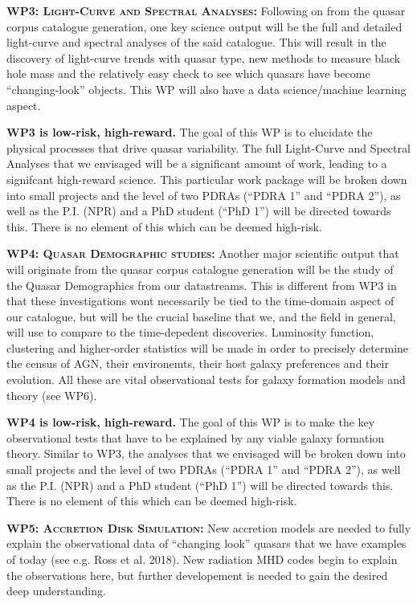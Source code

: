 \documentclass[oneside, a4paper, onecolumn, 11pt]{article}
\begin{document}
\smallskip
\smallskip
\noindent
\textbf{\textsc{WP3: Light-Curve and Spectral Analyses:}} 
Following on from the quasar corpus catalogue generation, one key
science output will be the full and detailed light-curve and spectral
analyses of the said catalogue. This will result in the discovery of
light-curve trends with quasar type, new methods to measure black hole
mass and the relatively easy check to see which quasars have become
``changing-look'' objects. This WP will also have a data science/machine learning 
aspect.

\noindent
{\bf WP3 is low-risk, high-reward.} 
The goal of this WP is to elucidate the physical processes that drive quasar variability.
The full Light-Curve and Spectral
Analyses that we envisaged will be a significant amount of work,
leading to a signifcant high-reward science. This particular work
package will be broken down into small projects and the level of two
PDRAs (``PDRA 1'' and ``PDRA 2''), as well as the P.I. (NPR) and a PhD
student (``PhD 1'') will be directed towards this. There is no element
of this which can be deemed high-risk.


\smallskip
\smallskip
\noindent
\textbf{\textsc{WP4: Quasar Demographic studies:}} 
Another major scientific output that will originate from the quasar
corpus catalogue generation will be the study of the Quasar
Demographics from our datastreams. This is different from WP3 in that
these investigations wont necessarily be tied to the time-domain
aspect of our catalogue, but will be the crucial baseline that we, and
the field in general, will use to compare to the time-depedent
discoveries. Luminosity function, clustering and higher-order
statistics will be made in order to precisely determine the census of
AGN, their environemts, their host galaxy preferences and their
evolution. All these are vital observational tests for galaxy
formation models and theory (see WP6).

\noindent
{\bf WP4 is low-risk, high-reward.}
The goal of this WP is to make the key observational tests that have to be explained by any 
viable galaxy formation theory. 
Similar to WP3, the analyses that we envisaged will be broken down
into small projects and the level of two PDRAs (``PDRA 1'' and ``PDRA
2''), as well as the P.I. (NPR) and a PhD student (``PhD 1'') will be
directed towards this. There is no element of this which can be deemed
high-risk.


\smallskip
\smallskip
\noindent
\textbf{\textsc{WP5: Accretion Disk Simulation:}} 
New accretion models are needed to fully explain the observational
data of ``changing look'' quasars that we have examples of today (see
e.g. Ross et al. 2018). New radiation MHD codes begin to explain the
observations here, but further developement is needed to gain the
desired deep understanding. 
\end{document}
